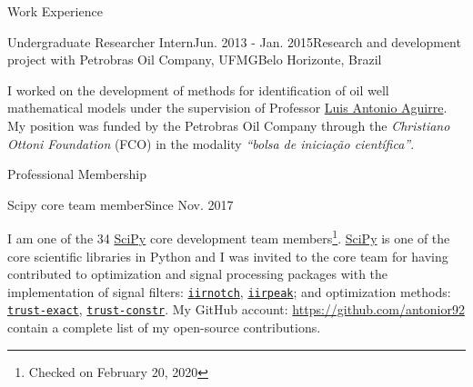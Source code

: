 \documentclass{resume} %
\begin{document}
\begin{rSection}{Work Experience}

\begin{rSubsection}{Undergraduate Researcher Intern}{Jun. 2013 - Jan. 2015}{Research and development project with Petrobras Oil Company, UFMG}{Belo Horizonte, Brazil}
\item I worked on the development of methods for identification of oil well mathematical models under the supervision of Professor \href{https://scholar.google.com.br/citations?user=_zkC6_kAAAAJ&hl=en}{Luis Antonio Aguirre}. My position was funded by the Petrobras Oil Company through the \textit{Christiano Ottoni Foundation} (FCO) in the modality \textit{``bolsa de inicia\c{c}\~ao cient\'ifica''}.
\end{rSubsection}

\end{rSection}





\begin{rSection}{Professional Membership}


\begin{rSubsection}{Scipy core team member}{Since Nov. 2017}{}{}
  \item I am one of the 34 \href{https://www.scipy.org}{SciPy} core development  team members\footnote{Checked on February 20, 2020}.
  \href{https://www.scipy.org}{SciPy} is one of the core scientific libraries in Python and I was invited to the core team for having contributed to optimization and signal processing packages with the implementation of signal filters: \href{http://scipy.github.io/devdocs/generated/scipy.signal.iirnotch.html}{\texttt{iirnotch}}, \href{http://scipy.github.io/devdocs/generated/scipy.signal.iirpeak.html}{\texttt{iirpeak}}; and optimization methods: \href{http://scipy.github.io/devdocs/optimize.minimize-trustexact.html}{\texttt{trust-exact}}, \href{http://scipy.github.io/devdocs/optimize.minimize-trustconstr.html}{\texttt{trust-constr}}. My GitHub account: \href{https://github.com/antonior92}{https://github.com/antonior92} contain a complete list of my open-source contributions.
\end{rSubsection}
\end{rSection}
\end{document}
